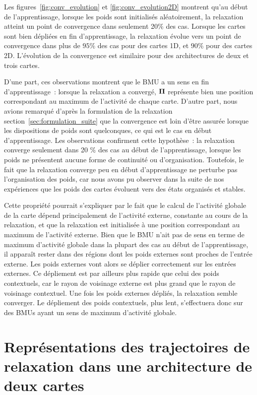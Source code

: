 \documentclass[../main]{subfiles}
\begin{document}
Les figures~\ref{fig:conv_evolution} et \ref{fig:conv_evolution2D} montrent qu'au début de l'apprentissage, lorsque les poids sont initialisés aléatoirement, la relaxation atteint un point de convergence dans seulement 20\% des cas. Lorsque les cartes sont bien dépliées en fin d'apprentissage, la relaxation évolue vers un point de convergence dans plus de $95\%$ des cas pour des cartes 1D, et $90\%$ pour des cartes 2D. L'évolution de la convergence est similaire pour des architectures de deux et trois cartes.

D'une part, ces observations montrent que le BMU a un sens en fin d'apprentissage~: lorsque la relaxation a convergé, $\mathbf{\Pi}$ représente bien une position correspondant au maximum de l'activité de chaque carte.
D'autre part, nous avions remarqué d'après la formulation de la relaxation section~\ref{sec:formulation_suite} que la convergence est loin d'être assurée lorsque les dispositions de poids sont quelconques, ce qui est  le cas en début d'apprentissage. 
Les observations confirment cette hypothèse~: la relaxation converge seulement dans 20 \% des cas au début de l'apprentissage, lorsque les poids ne présentent aucune forme de continuité ou d'organisation.
Toutefois, le fait que la relaxation converge peu en début d'apprentissage ne perturbe pas l'organisation des poids, car nous avons pu observer dans la suite de nos expériences que les poids des cartes évoluent vers des états organisés et stables.

Cette propriété pourrait s'expliquer par le fait que le calcul de l'activité globale de la carte dépend principalement de l'activité externe, constante au cours de la relaxation, et que la relaxation est initialisée à une position correspondant au maximum de l'activité externe.
Bien que le BMU n'ait pas de sens en terme de maximum d'activité globale dans la plupart des cas au début de l'apprentissage, il apparaît rester dans des régions dont les poids externes sont proches de l'entrée externe.
Les poids externes vont alors se déplier correctement sur les entrées externes. Ce dépliement est par ailleurs plus rapide que celui des poids contextuels, car le rayon de voisinage externe est plus grand que le rayon de voisinage contextuel.
Une fois les poids externes dépliés, la relaxation semble converger. Le dépliement des poids contextuels, plus lent, s'effectuera donc sur des BMUs ayant un sens de maximum d'activité globale.

\section{Représentations des trajectoires de relaxation dans une architecture de deux cartes}
\end{document}
